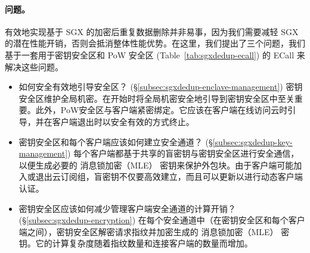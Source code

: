 \paragraph*{问题。} 有效地​​实现基于 SGX 的加密后重复数据删除并非易事，因为我们需要减轻 SGX 的潜在性能开销，否则会抵消整体性能优势。在这里，我们提出了三个问题，我们基于一套用于密钥安全区和 PoW 安全区 (Table~\ref{tab:sgxdedup-ecall}) 的 ECall 来解决这些问题。

\begin{itemize}[leftmargin=*]
\item 如何安全有效地引导安全区？ (\S\ref{subsec:sgxdedup-enclave-management})
  密钥安全区维护全局机密。在开始时将全局机密安全地引导到密钥安全区中至关重要。此外，PoW安全区与客户端紧密绑定。它应该在客户端在线访问云时引导，并在客户端退出时以安全有效的方式终止。
\item 密钥安全区和每个客户端应该如何建立安全通道？ (\S\ref{subsec:sgxdedup-key-management})
  每个客户端都基于共享的盲密钥与密钥安全区进行安全通信，以便生成必要的 消息锁加密（MLE） 密钥来保护外包块。由于客户端可能加入或退出云订阅组，盲密钥不仅要高效建立，而且可以更新以进行动态客户端认证。
\item 密钥安全区应该如何减少管理客户端安全通道的计算开销？ (\S\ref{subsec:sgxdedup-encryption})
  在每个安全通道中（在密钥安全区和每个客户端之间），密钥安全区解密请求指纹并加密生成的 消息锁加密（MLE） 密钥。它的计算复杂度随着指纹数量和连接客户端的数量而增加。
\end{itemize}
